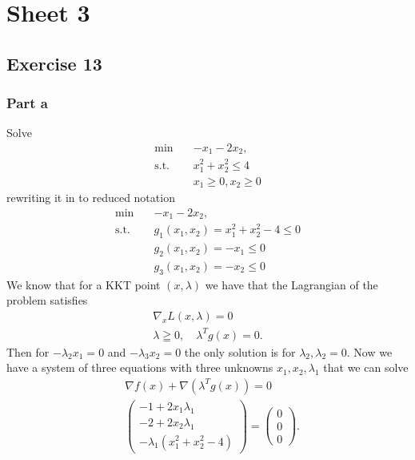 


\maketitle
\tableofcontents

\section{Sheet 3}
\subsection{Exercise 13}
\subsubsection{Part a}
Solve
\begin{align}
    \text{min}\quad & -x_1 - 2x_2,\\
    \text{s.t.}\quad & x_1^{2} + x_2^{2} \le 4 \nonumber\\
    &x_1\ge 0, x_2 \ge 0 \nonumber
\end{align}
rewriting it in to reduced notation
\begin{align}
    \text{min}\quad & -x_1 - 2x_2,\\
    \text{s.t.}\quad & g_1(x_1, x_2) = x_1^{2} + x_2^{2} -4 \le 0 \nonumber\\
    &g_2(x_1,x_2) = - x_1 \le 0\nonumber\\
    &g_3(x_1,x_2) = - x_2 \le 0\nonumber
\end{align}
We know that for a KKT point $(x, \lambda)$ we have that the
Lagrangian of the problem satisfies
\begin{align}
    \nabla_x L(x, \lambda) = 0\\
    \lambda\geqq 0,\quad \lambda^Tg(x) = 0.
\end{align}
Then for $-\lambda_2 x_1 =0$ and $-\lambda_3 x_2 =0$ the only solution is for
$\lambda_2, \lambda_2 = 0$. Now we have a system of three equations with
three unknowns $x_1, x_2, \lambda_1$ that we can solve
\begin{align}
    &\nabla f(x) + \nabla(\lambda^{T}g(x)) =0\\
    &\begin{pmatrix}
        -1 + 2x_1\lambda_1\\
        -2 + 2x_2\lambda_1\\
        -\lambda_1(x_1^{2}+x_2^{2}-4)
    \end{pmatrix}
    =\begin{pmatrix} 0\\0\\0 \end{pmatrix}.
\end{align}
